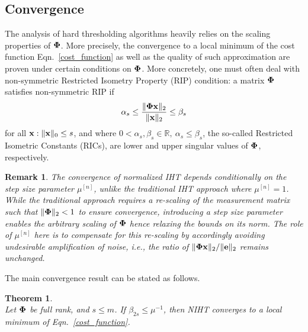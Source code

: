 \documentclass{article}
\newtheorem{theorem}{Theorem}
\newtheorem{remark}{Remark}
\begin{document}
\subsection{Convergence} 
The analysis of hard thresholding algorithms heavily relies on the scaling properties of ${\bf \Phi}$. More precisely, the convergence to a local minimum of the cost function Eqn.~\ref{cost_function} as well as the quality of such approximation are proven under certain conditions on ${\bf \Phi}$. More concretely, one must often deal with non-symmetric Restricted Isometry Property (RIP) condition: a matrix ${\bf \Phi}$ satisfies non-symmetric RIP if
\begin{equation}\label{rip}
\alpha_{s} \leq \frac{\|{\bf \Phi} {\bf x}\|_2}{\|{\bf x}\|_2} \leq \beta_{s}
\end{equation}
for all ${\bf x}: \|{\bf x}\|_0 \leq s$, and where $0<\alpha_s, \beta_s \in \mathbb{R}, \ \alpha_s\leq \beta_s$, the so-called Restricted Isometric Constants (RICs), are lower and upper singular values of ${\bf \Phi}$, respectively.

\begin{remark}\label{remark_noise_amp}
The convergence of normalized IHT depends conditionally on the step size parameter $\mu^{[n]}$, unlike the traditional IHT approach where $\mu^{[n]}=1$.
While the traditional approach requires a re-scaling of the measurement matrix such that $\|{\bf \Phi}\|_2 <1$ to ensure convergence, introducing a step size parameter enables the arbitrary scaling of ${\bf \Phi}$ hence relaxing the bounds on its norm. The role of $\mu^{[n]}$ here is to compensate for this re-scaling by accordingly avoiding undesirable amplification of noise, i.e., the ratio of $\|{\bf \Phi x}\|_2/\|{\bf e}\|_2$ remains unchanged. 
\end{remark}
The main convergence result can be stated as follows.
\begin{theorem}\label{theorem_convergence_IHT}
{\rm{\cite{blumensath2012greedy}}}\\ 
Let ${\bf \Phi}$ be full rank, and $s\leq m$. If $\beta_{2s}\leq\mu^{-1}$, then NIHT converges to a local minimum of Eqn.~\ref{cost_function}.
\end{theorem}
\end{document}

